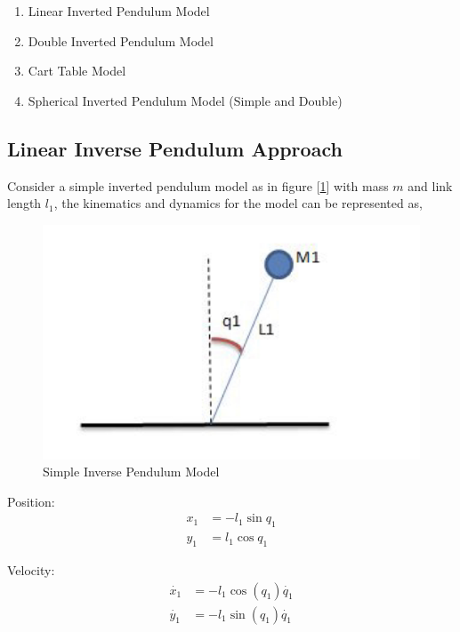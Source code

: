 \begin{enumerate}
    \item Linear Inverted Pendulum Model
    \item Double Inverted Pendulum Model
    \item Cart Table Model
    \item Spherical Inverted Pendulum Model (Simple and Double)
\end{enumerate}


\subsection{Linear Inverse Pendulum Approach}

Consider a simple inverted pendulum model as in figure [\ref{ipm}] with mass $m$ and link length $l_1$, the kinematics and dynamics for the model can be represented as,

\begin{figure}[h!]
    \centering
    \includegraphics[scale=.15]{images/ipm.jpeg}\hfill
    \caption{Simple Inverse Pendulum Model}\hfill
    \label{ipm}
\end{figure}

Position:
\begin{equation}
\begin{split}
    x_1 &= -l_1\sin{q_1} \\
    y_1 &= l_1\cos{q_1}
\end{split}
\end{equation}

Velocity:
\begin{equation}
\begin{split}
    \Dot{x_1} &= -l_1\cos({q_1})\Dot{q_1} \\
    \Dot{y_1} &= -l_1\sin({q_1})\Dot{q_1}
\end{split}
\end{equation}

